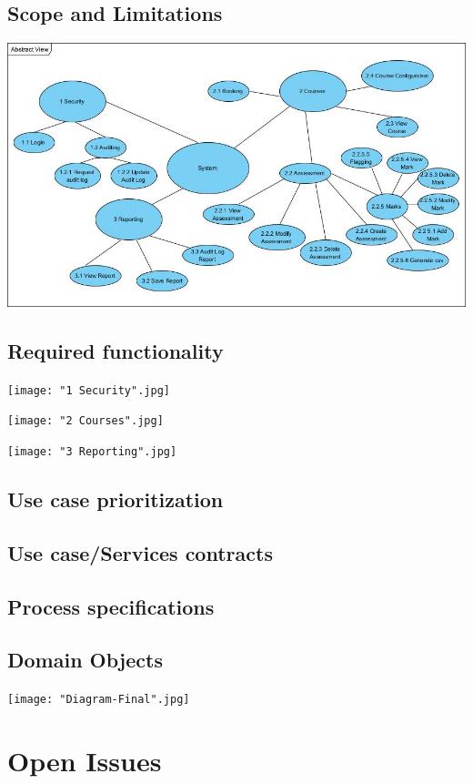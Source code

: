 \documentclass[10pt,a4paper]{article}
\begin{document}
\subsection{Scope and Limitations}

\begin{center}
\includegraphics[scale=0.5]{AbstractView.jpg}
\end{center}


\subsection{Required functionality}


\texttt{[image: "1 Security".jpg]}

\texttt{[image: "2 Courses".jpg]}

\texttt{[image: "3 Reporting".jpg]}

\subsection{Use case prioritization}
\subsection{Use case/Services contracts}
\subsection{Process specifications}
\subsection{Domain Objects}


\texttt{[image: "Diagram-Final".jpg]}

\section{Open Issues}
\end{document}
